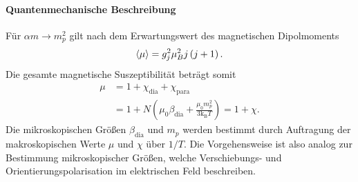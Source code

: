 	\paragraph{Quantenmechanische Beschreibung}
	Für $ \alpha m \to m_{p}^2$ gilt nach dem Erwartungswert des magnetischen Dipolmoments 
	$$
	\braket{\mu} = g_{j}^2 \mu_{B}^2 j\left( j+1 \right).
	$$ 
	Die gesamte magnetische Suszeptibilität beträgt somit
	$$
	\begin{aligned}
		\mu &= 1 + \chi_\text{dia} + \chi_\text{para} \\
			&= 1 + N\left( \mu_0 \beta_{\text{dia}} + \frac{ \mu_0 m_{p}^2}{3 \mathrm{k}_{\mathrm{B}}T} \right)  = 1+ \chi.
	\end{aligned}
	$$
	Die mikroskopischen Größen $ \beta_{\text{dia}}$ und $m_{p}$ werden bestimmt durch Auftragung der makroskopischen Werte $ \mu$ und $ \chi$ über $ 1 /T$. Die Vorgehensweise ist also analog zur Bestimmung mikroskopischer Größen, welche Verschiebungs- und Orientierungspolarisation im elektrischen Feld beschreiben.


